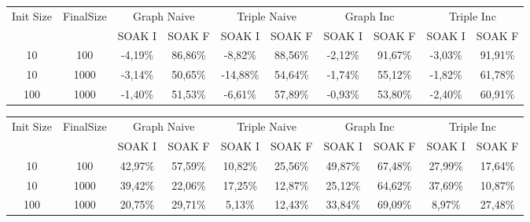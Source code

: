 \begin{sidewaystable}
	\begin{tabular}{c|c|cc|cc|cc|cc} %
	  	\hline
		Init Size&FinalSize &\multicolumn{2}{c}{Graph Naive}  &\multicolumn{2}{c}{Triple Naive}&\multicolumn{2}{c}{Graph Inc}  &\multicolumn{2}{c}{Triple Inc}\\\
		&& SOAK I & SOAK F& SOAK I & SOAK F& SOAK I & SOAK F& SOAK I & SOAK F\\
		\hline
		\hline
		10&100&-4,19\%&\cellcolor[HTML]{C0C0C0}86,86\%&-8,82\%&\cellcolor[HTML]{C0C0C0}88,56\%&-2,12\%&\cellcolor[HTML]{C0C0C0}91,67\%&-3,03\%&\cellcolor[HTML]{C0C0C0}91,91\%\\
		10&1000&-3,14\%&\cellcolor[HTML]{C0C0C0}50,65\%&-14,88\%&\cellcolor[HTML]{C0C0C0}54,64\%&-1,74\%&\cellcolor[HTML]{C0C0C0}55,12\%&-1,82\%&\cellcolor[HTML]{C0C0C0}61,78\%\\
		100&1000&-1,40\%&\cellcolor[HTML]{C0C0C0}51,53\%&-6,61\%&\cellcolor[HTML]{C0C0C0}57,89\%&-0,93\%&\cellcolor[HTML]{C0C0C0}53,80\%&-2,40\%&\cellcolor[HTML]{C0C0C0}60,91\%\\
		\hline
	\end{tabular}
	\caption[\textsc{Analyser} Investigation Stack - Level 1 - Step Response Test Maximum Latency Comparison]{\textsc{Analyser} Investigation Stack - Level 1 Step Response Test maximum latency comparison.}
	\label{tab:step_latency_comparisons_max}
	

	\begin{tabular}{c|c|cc|cc|cc|cc} %
	  	\hline
		Init Size&FinalSize &\multicolumn{2}{c}{Graph Naive}  &\multicolumn{2}{c}{Triple Naive}&\multicolumn{2}{c}{Graph Inc}  &\multicolumn{2}{c}{Triple Inc}\\\
		&& SOAK I & SOAK F& SOAK I & SOAK F& SOAK I & SOAK F& SOAK I & SOAK F\\
		\hline
		\hline
		10&100&42,97\%&\cellcolor[HTML]{C0C0C0}57,59\%&10,82\%&25,56\%&49,87\%&\cellcolor[HTML]{C0C0C0}67,48\%&27,99\%&17,64\%\\
		10&1000&39,42\%&22,06\%&17,25\%&12,87\%&25,12\%&\cellcolor[HTML]{C0C0C0}64,62\%&37,69\%&10,87\%\\
		100&1000&20,75\%&29,71\%&5,13\%&12,43\%&33,84\%&\cellcolor[HTML]{C0C0C0}69,09\%&8,97\%&27,48\%\\
		\hline
	\end{tabular}
	\caption[\textsc{Analyser} Investigation Stack - Level 1 - Step Response Test Maximum Memory Comparison]{\textsc{Analyser} Investigation Stack - Level 1 Step Response Test maximum memory comparison.}
	\label{tab:step_memory_comparisons_max}

	
\end{sidewaystable}